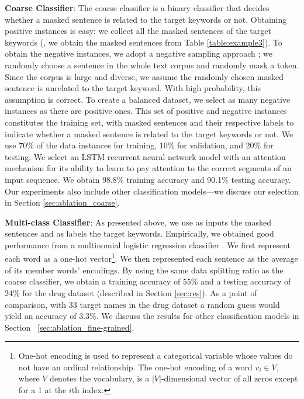 \noindent \textbf{Coarse Classifier}: 
The coarse classifier is a binary classifier that decides whether a masked sentence is related to the target keywords or not. 
Obtaining positive instances is easy: we collect all the masked sentences of the target keywords (\eg, we obtain the masked sentences from Table \ref{table:example3}). 
To obtain the negative instances, we adopt a negative sampling approach \cite{mikolov2013distributed}; 
we randomly choose a sentence in the whole 
text corpus and randomly mask a token. 
Since the corpus is large and diverse, we assume the randomly chosen masked sentence is unrelated to the target keyword. 
With high probability, this assumption is correct.
To create a balanced dataset, we select as many negative instances as there are positive ones. 
This set of positive and negative instances constitutes the training set, with masked sentences and their respective labels to indicate whether a masked sentence is related to the target keywords or not. 
We use 70\% of the data instances for training, 10\% for validation, and 20\% for testing. 
We select an LSTM recurrent neural network model \cite{hochreiter1997long} with an attention mechanism \cite{bahdanau2015neural} for its ability to learn  to pay attention to the correct segments of an input sequence. 
We obtain 98.8\% training accuracy 
and 90.1\% testing accuracy. 
Our experiments also include other classification models---we discuss our selection in Section \ref{sec:ablation_coarse}. 

\noindent \textbf{Multi-class Classifier}:
As presented above, we use as inputs the masked sentences and as labels the target keywords. 
Empirically, we obtained good performance from a multinomial logistic regression classifier \cite{hosmer2013applied}.
We first represent each word as a one-hot vector\footnote{One-hot encoding is used to represent a categorical variable whose values do not have an  ordinal relationship. %
The one-hot encoding of a word $v_i\in V$, where $V$ denotes the vocabulary, is a $|V|$-dimensional vector of all zeros except for a 1 at the $i$th index.}.
We then represented each sentence as the average of its member words' encodings. 
By using the same data splitting ratio as the coarse classifier, we obtain a training accuracy of 55\% and a testing accuracy of 24\%  for the drug dataset (described in Section \ref{sec:res}). 
As a point of comparison, with 33 target names in the drug dataset a random guess  would yield an accuracy of 3.3\%. 
We discuss the results for other classification models in Section~ \ref{sec:ablation_fine-grained}.
